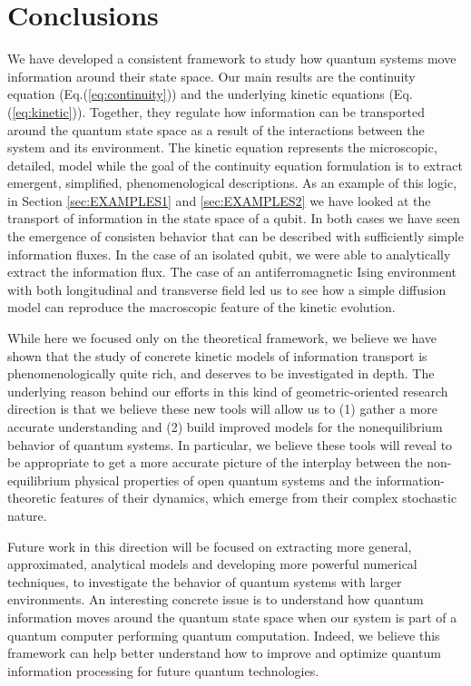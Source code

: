 \documentclass[%
 reprint,
 superscriptaddress,
 aps,
 pra,
]{revtex4-2}
\theoremstyle{definition}
\begin{document}
\section{Conclusions}
\label{sec:FINAL}

We have developed a consistent framework to study how quantum systems move
information around their state space. Our main results are the continuity equation (Eq.(\ref{eq:continuity}))
and the underlying kinetic equations (Eq.(\ref{eq:kinetic})). Together, they regulate how information
can be transported around the quantum state space as a result of the interactions between the
system and its environment. The kinetic equation represents the microscopic, detailed, model 
while the goal of the continuity equation formulation is to extract emergent, simplified, phenomenological descriptions. 
As an example of this logic, in Section \ref{sec:EXAMPLES1} and \ref{sec:EXAMPLES2} 
we have looked at the transport of information in the state space of a qubit. In both cases we have 
seen the emergence of consisten behavior that can be described with sufficiently simple information 
fluxes. In the case of an isolated qubit, we were able to analytically extract the information flux. The 
case of an antiferromagnetic Ising environment with both longitudinal and transverse field led us to 
see how a simple diffusion model can reproduce the macroscopic feature of the kinetic evolution.

While here we focused only on the theoretical framework, we believe we have shown that the 
study of concrete kinetic models of information transport is phenomenologically quite rich, and
deserves to be investigated in depth. The underlying reason behind our efforts in this kind of geometric-oriented 
research direction is that we believe these new tools will allow us to (1) gather a more accurate understanding
and (2) build improved models for the nonequilibrium behavior of quantum systems. In particular, we
believe these tools will reveal to be appropriate to get a more accurate picture of the interplay between 
the non-equilibrium physical properties of open quantum systems and the information-theoretic features
of their dynamics, which emerge from their complex stochastic nature.



Future work in this direction will be focused on extracting more general, approximated, analytical models and 
developing more powerful numerical techniques, to investigate the behavior of quantum systems with larger 
environments. An interesting concrete issue is to understand how quantum information moves around the 
quantum state space when our system is part of a quantum computer performing quantum computation.
Indeed, we believe this framework can help better understand how to improve and optimize quantum information
processing for future quantum technologies.
\end{document}
